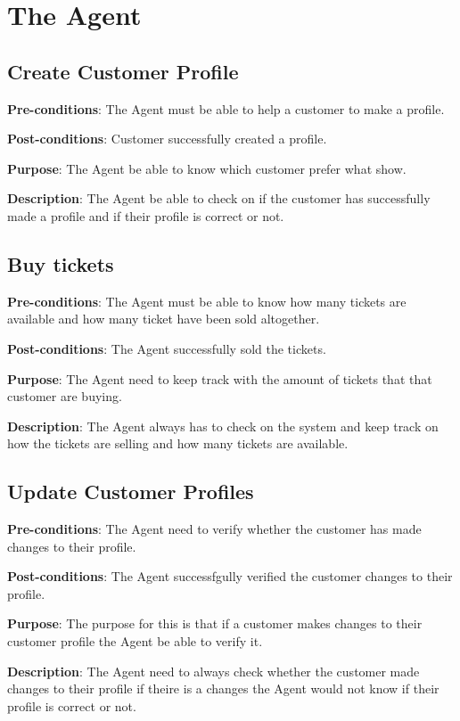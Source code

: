 \section{The Agent}

\subsection{Create Customer Profile}
\textbf{Pre-conditions}: The Agent must be able to help a customer
to make a profile.

\textbf{Post-conditions}: Customer successfully created a profile.

\textbf{Purpose}: The Agent be able to know which customer prefer
what show.

\textbf{Description}: The Agent be able to check on if the customer
has successfully made a profile and if their profile is correct or
not.

\subsection{Buy tickets}
\textbf{Pre-conditions}: The Agent must be able to know how many
tickets are available and how many ticket have been sold altogether.

\textbf{Post-conditions}: The Agent successfully sold the tickets.

\textbf{Purpose}: The Agent need to keep track with the amount of
tickets that that customer are buying.

\textbf{Description}: The Agent always has to check on the system
and keep track on how the tickets are selling and how many tickets
are available.

\subsection{Update Customer Profiles}
\textbf{Pre-conditions}: The Agent need to verify whether the
customer has made changes to their profile.

\textbf{Post-conditions}: The Agent successfgully verified the
customer changes to their profile.

\textbf{Purpose}: The purpose for this is that if a customer makes
changes to their customer profile the Agent be able to verify it.

\textbf{Description}: The Agent need to always check whether the
customer made changes to their profile if theire is a changes the
Agent would not know if their profile is correct or not.

